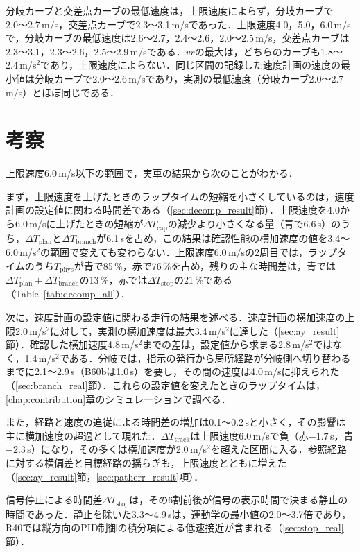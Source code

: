 分岐カーブと交差点カーブの最低速度は，上限速度によらず，分岐カーブで2.0〜2.7\,m/s，交差点カーブで2.3〜3.1\,m/sであった．上限速度4.0，5.0，6.0\,m/sで，分岐カーブの最低速度は2.6〜2.7，2.4〜2.6，2.0〜2.5\,m/s，交差点カーブは2.3〜3.1，2.3〜2.6，2.5〜2.9\,m/sである．$vr$の最大は，どちらのカーブも1.8〜2.4\,m/s$^2$であり，上限速度によらない．同じ区間の記録した速度計画の速度の最小値は分岐カーブで2.0〜2.6\,m/sであり，実測の最低速度（分岐カーブ2.0〜2.7\,m/s）とほぼ同じである．

\section{考察}
\label{sec:field_discussion}
上限速度6.0\,m/s以下の範囲で，実車の結果から次のことがわかる．

まず，上限速度を上げたときのラップタイムの短縮を小さくしているのは，速度計画の設定値に関わる時間差である（\ref{sec:decomp_result}節）．上限速度を4.0から6.0\,m/sに上げたときの短縮が$\Delta T_{\mathrm{cap}}$の減少より小さくなる量（青で6.6\,s）のうち，$\Delta T_{\mathrm{plan}}$と$\Delta T_{\mathrm{branch}}$が6.1\,sを占め，この結果は確認性能の横加速度の値を3.4〜6.0\,m/s$^2$の範囲で変えても変わらない．上限速度6.0\,m/sの2周目では，ラップタイムのうち$T_{\mathrm{phys}}$が青で85\,\%，赤で76\,\%を占め，残りの主な時間差は，青では$\Delta T_{\mathrm{plan}}+\Delta T_{\mathrm{branch}}$の13\,\%，赤では$\Delta T_{\mathrm{stop}}$の21\,\%である（Table~\ref{tab:decomp_all}）．

次に，速度計画の設定値に関わる走行の結果を述べる．速度計画の横加速度の上限2.0\,m/s$^2$に対して，実測の横加速度は最大3.4\,m/s$^2$に達した（\ref{sec:ay_result}節）．確認した横加速度4.8\,m/s$^2$までの差は，設定値から求まる2.8\,m/s$^2$ではなく，1.4\,m/s$^2$である．分岐では，指示の発行から局所経路が分岐側へ切り替わるまでに2.1〜2.9\,s（B60bは1.0\,s）を要し，その間の速度は4.0\,m/sに抑えられた（\ref{sec:branch_real}節）．これらの設定値を変えたときのラップタイムは，\ref{chap:contribution}章のシミュレーションで調べる．

また，経路と速度の追従による時間差の増加は0.1〜0.2\,sと小さく，その影響は主に横加速度の超過として現れた．$\Delta T_{\mathrm{track}}$は上限速度6.0\,m/sで負（赤$-1.7$\,s，青$-2.3$\,s）になり，その多くは横加速度が2.0\,m/s$^2$を超えた区間に入る．参照経路に対する横偏差と目標経路の揺らぎも，上限速度とともに増えた（\ref{sec:ay_result}節，\ref{sec:patherr_result}項）．

信号停止による時間差$\Delta T_{\mathrm{stop}}$は，その6割前後が信号の表示時間で決まる静止の時間であった．静止を除いた3.3〜4.9\,sは，運動学の最小値の2.0〜3.7倍であり，R40では縦方向のPID制御の積分項による低速接近が含まれる（\ref{sec:stop_real}節）．
